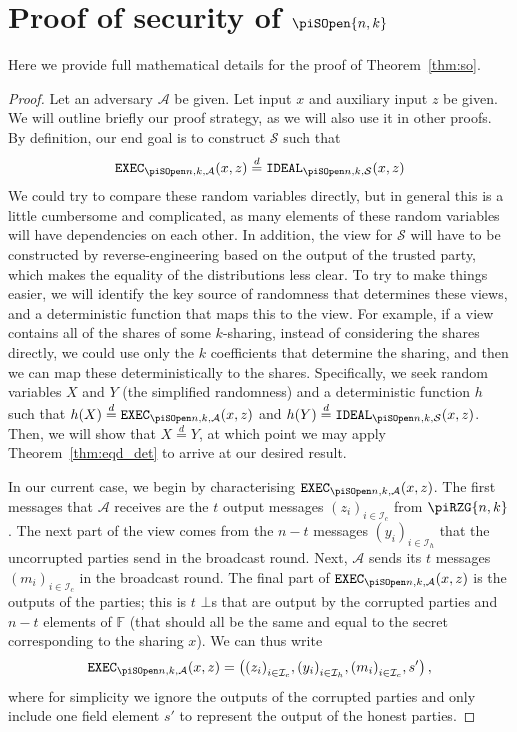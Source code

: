 \documentclass{article}
\newcommand{\eqd}[0]{\stackrel{d}{=}}
\theoremstyle{remark}
\newcommand{\F}{\mathbb{F}}
\begin{document}
\section{Proof of security of $\piSOpen{n,k}$}\label{app:so}

Here we provide full mathematical details for the proof of
Theorem~\ref{thm:so}.

\begin{proof}
	\newcommand{\proto}{\piSOpen{n,k}}

	Let an adversary $\mathcal{A}$ be given. Let input $x$ and auxiliary input
	$z$ be given. We will outline briefly our proof strategy, as we will also
	use it in other proofs. By definition, our end goal is to construct
	$\mathcal{S}$ such that
	\begin{align*}
		\execD \eqd \idealD
	\end{align*}
	We could try to compare these random variables directly, but in general
	this is a little cumbersome and complicated, as many elements of these
	random variables will have dependencies on each other. In addition, the
	view for $\mathcal{S}$ will have to be constructed by reverse-engineering
	based on the output of the trusted party, which makes the equality of the
	distributions less clear. To try to make things easier, we will identify
	the key source of randomness that determines these views, and a
	deterministic function that maps this to the view. For example, if a view
	contains all of the shares of some $k$-sharing, instead of considering the
	shares directly, we could use only the $k$ coefficients that determine the
	sharing, and then we can map these deterministically to the shares.
	Specifically, we seek random variables $X$ and $Y$ (the simplified
	randomness) and a deterministic function $h$ such that $h(X) \eqd \execD$
	and $h(Y) \eqd \idealD$. Then, we will show that $X \eqd Y$, at which point
	we may apply Theorem~\ref{thm:eqd_det} to arrive at our desired result.

	In our current case, we begin by characterising $\execD$. The first
	messages that $\mathcal{A}$ receives are the $t$ output messages
	${(z_i)}_{i \in \mathcal{I}_c}$ from $\piRZG{n, k}$. The next part of the
	view comes from the $n - t$ messages ${(y_i)}_{i \in \mathcal{I}_h}$ that
	the uncorrupted parties send in the broadcast round. Next, $\mathcal{A}$
	sends its $t$ messages ${(m_i)}_{i \in \mathcal{I}_c}$ in the broadcast
	round. The final part of $\execD$ is the outputs of the parties; this is
	$t$ $\bot$s that are output by the corrupted parties and $n-t$ elements of
	$\F$ (that should all be the same and equal to the secret corresponding to
	the sharing $x$). We can thus write
	\begin{align*}
		\execD
		=
		\left(
			{(z_i)}_{i \in \mathcal{I}_c},
			{(y_i)}_{i \in \mathcal{I}_h},
			{(m_i)}_{i \in \mathcal{I}_c},
			s'
		\right),
	\end{align*}
	where for simplicity we ignore the outputs of the corrupted parties and
	only include one field element $s'$ to represent the output of the honest
	parties.


\end{proof}
\end{document}
